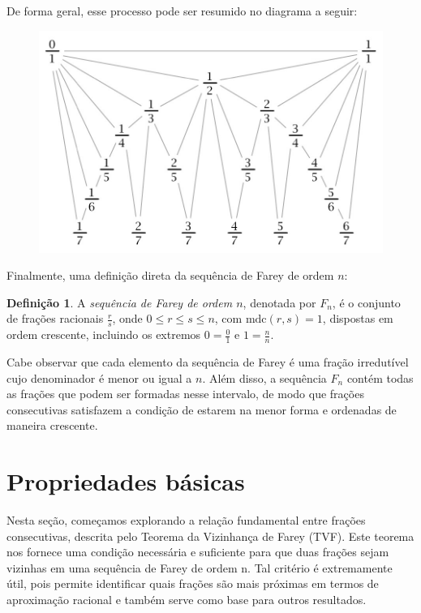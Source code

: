 \documentclass{hipatia}
\theoremstyle{definition} %
\newtheorem*{definition*}{Definição} %
\begin{document}
De forma geral, esse processo pode ser resumido no diagrama a seguir:

\begin{figure}[h]
    \centering
    \includegraphics[width=1\linewidth]{diagrama.jpeg}

\end{figure}



Finalmente, uma definição direta da sequência de Farey de ordem \( n \):

\begin{definition*}
    A \textit{sequência de Farey de ordem \( n \)}, denotada por \( F_n \), é o conjunto de frações racionais \(\frac{r}{s}\), onde \(0 \leq r \leq s \leq n\), com \(\text{mdc}(r, s) = 1\), dispostas em ordem crescente, incluindo os extremos \(0 = \frac{0}{1}\) e \(1 = \frac{n}{n}\). 
\end{definition*}
    Cabe observar que cada elemento da sequência de Farey é uma fração irredutível cujo denominador é menor ou igual a \(n\). Além disso, a sequência \(F_n\) contém todas as frações que podem ser formadas nesse intervalo, de modo que frações consecutivas satisfazem a condição de estarem na menor forma e ordenadas de maneira crescente.


\section{Propriedades básicas}

Nesta seção, começamos explorando a relação fundamental entre frações consecutivas, descrita pelo Teorema da Vizinhança de Farey (TVF). Este teorema nos fornece uma condição necessária e suficiente para que duas frações sejam vizinhas em uma sequência de Farey de ordem n. Tal critério é extremamente útil, pois permite identificar quais frações são mais próximas em termos de aproximação racional e também serve como base para outros resultados.
\end{document}
